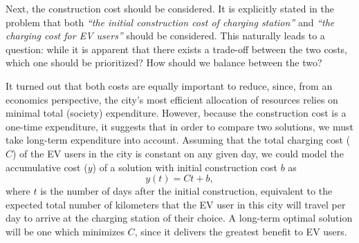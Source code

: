 \documentclass[10pt]{article}
\begin{document}
Next, the construction cost should be considered. It is explicitly stated in the problem that both \textsl{“the initial construction cost of charging station”} and \textsl{“the charging cost for EV users”} should be considered. This naturally leads to a question: while it is apparent that there exists a trade-off between the two costs, which one should be prioritized? How should we balance between the two?

It turned out that both costs are equally important to reduce, since, from an economics perspective, the city's most efficient allocation of resources relies on minimal total (society) expenditure. However, because the construction cost is a one-time expenditure, it suggests that in order to compare two solutions, we must take long-term expenditure into account. Assuming that the total charging cost ($C$) of the EV users in the city is constant on any given day, we could model the accumulative cost ($y$) of a solution with initial construction cost $b$ as
\begin{equation}\label{eq:1}
y(t) = Ct + b,
\end{equation}
where $t$ is the number of days after the initial construction, equivalent to the expected total number of kilometers that the EV user in this city will travel per day to arrive at the charging station of their choice. A long-term optimal solution will be one which minimizes $C$, since it delivers the greatest benefit to EV users.
\end{document}
